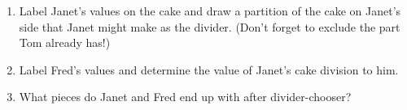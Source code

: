 \documentclass[12pt]{article}
\newcommand{\ans}[1][1in]{\rule{#1}{.5pt}}
\begin{document}
\begin{enumerate}
\begin{enumerate}
\begin{enumerate}
\item Label Janet's values on the cake and draw a partition of the cake on Janet's side that Janet might make as the divider. (Don't forget to exclude the part Tom already has!)
\item Label Fred's values and determine the value of Janet's cake division to him.
\item What pieces do Janet and Fred end up with after divider-chooser?
\end{enumerate}

\bigskip

\begin{center}
\def\r{1.2}
\hspace{1cm}
\end{center}

\end{enumerate}

\vfill




%
%
%
\end{enumerate}
\end{document}

